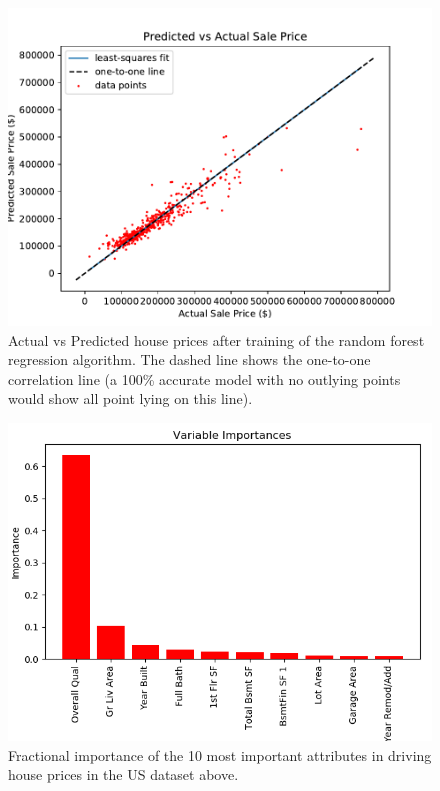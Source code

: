 \documentclass[10pt]{article}
\begin{document}
\begin{figure}
\begin{center}
\includegraphics[scale=0.8,angle=0,trim=0cm 0cm 0cm 2cm]{fig_actual_vs_predict.pdf}
\caption{Actual vs Predicted house prices after training of the random forest regression algorithm. The dashed line shows the one-to-one correlation line (a 100\% accurate model with no outlying points would show all point lying on this line).}
\label{fig_predict}
\end{center}
\end{figure} 


\begin{figure}
\begin{center}
\includegraphics[scale=0.8,angle=0,trim=0cm 0cm 0cm 2cm]{importances_0_0.png}
\caption{Fractional importance of the 10 most important attributes in driving house prices in the US dataset above.}
\label{fig_import}
\end{center}
\end{figure} 
\end{document}
